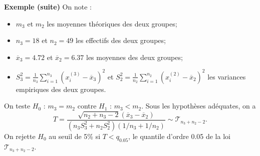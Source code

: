 \documentclass[aspectratio=169,xcolor=dvipsnames]{beamer}
\begin{document}
\begin{frame}	
	\begin{exampleblock}{\textbf{Exemple (suite)}}
	On note :
		\begin{itemize}
		\item $m_3$ et $m_2$ les moyennes théoriques des deux groupes;
		\item $n_3 = 18$ et $n_2 = 49$ les effectifs des deux groupes;
		\item $\overline{x}_3 = 4.72$ et $\overline{x}_2 = 6.37$ les moyennes des deux groupes;
		\item $S_3^2 = \frac{1}{n_3} \sum_{i=1}^{n_3} (x_i^{(3)} - \overline{x}_3)^2$ et $S_2^2 = \frac{1}{n_2} \sum_{i=1}^{n_2} (x_i^{(2)} - \overline{x}_2)^2 $ les variances empiriques des deux groupes.
		\end{itemize}
	
	\medskip		
		
	On teste $H_0$ : $m_3 = m_2$ contre $H_1$ : $m_3 < m_2$. Sous les hypothèses adéquates, on a 
		\[
		T = \dfrac{ \sqrt{n_2+n_3-2} \left(\overline{x}_3-\overline{x}_2 \right)}{\left( n_3 S_3^2 + n_2 S_2^2 \right) \left( 1/n_3 + 1/n_2 \right)} \sim \mathcal{T}_{n_3+n_2-2}.
		\]
	On rejette $H_0$ au seuil de 5\% si $T < q_{0.05}$, le quantile d'ordre 0.05 de la loi $\mathcal{T}_{n_3+n_2-2}$.   
	\end{exampleblock}

\end{frame}
\end{document}
